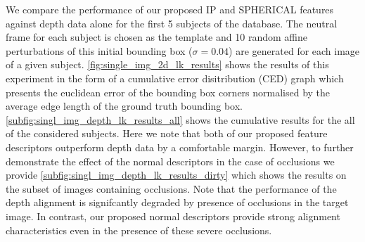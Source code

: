 We compare the performance of our proposed IP and SPHERICAL features against
depth data alone for the first 5 subjects of the database. The neutral frame
for each subject is chosen as the template and 10 random affine perturbations
of this initial bounding box ($\sigma = 0.04$) are generated for each image 
of a given subject.
\cref{fig:single_img_2d_lk_results} shows the results of this experiment in
the form of a cumulative error disitribution (CED) graph which presents
the euclidean error of the bounding box corners normalised by the
average edge length of the ground truth bounding box.
\cref{subfig:singl_img_depth_lk_results_all} shows the cumulative results for
the all of the considered subjects. Here we note that both of our proposed
feature descriptors outperform depth data by a comfortable margin. However,
to further demonstrate the effect of the normal descriptors in the case of
occlusions we provide \cref{subfig:singl_img_depth_lk_results_dirty} which
shows the results on the subset of images containing occlusions. Note that
the performance of the depth alignment is signifcantly degraded by presence
of occlusions in the target image. In contrast, our proposed normal descriptors
provide strong alignment characteristics even in the presence of these
severe occlusions.
